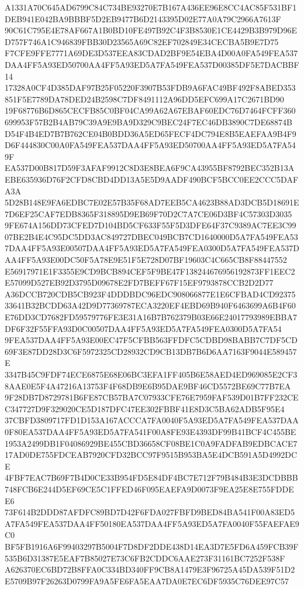 \documentclass[UTF8,fontset=fandol,zihao=-4,a4paper]{ctexart}
\begin{document}
{{A1331A70C645AD6799C84C734BE93270E7B167A436EE96E8CC4AC85F531BF1DEB941E042BA9BBBF5D2EB9477B6D2143395D02E77A0A79C2966A7613F
90C61C795E4E78AF667A1B0BD10FE497B92C4F3B8530E1CE4429B3B979D96ED757F746A1C946839FBB30D23565A69C82EF702849E34CECBA5B9E7D75
F7CFE9FFE7771A69DE3D537EEA83CDAD2BF9E54EBA4D00A0FA549FEA537DAA4FF5A93ED50700AA4FF5A93ED5A7FA549FEA537D00385DF5E7DACBBF14
17328A0CF4D385DAF97B25F05220F3907B53FDB9A6FAC49BF492F8ABED353851F5E7789DA78DED24B2598C7DF8491112A96DD5EFC699A17C2671BD90
19F68776B6D865CECFB85C0BF04CA99A62A67EBAF60EDC76D7464FCFF360699953F57B2B4AB79C39A9E9BA9D329C9BEC24F7EC46DB3890C7DE68874B
D54F4B4ED7B7B762CE04B0BDD36A5ED65FECF4DC794E8B5EAEFAA9B4F9D6F444830C00A0FA549FEA537DAA4FF5A93ED50700AA4FF5A93ED5A7FA549F
EA537D00B817D59F3AFAF9912C8D3E8BEA6F9CA43955BF8792BEC352B13AEBE635936D76F2CFD8CBD4DD13A5E5D9AADF490BCF5BCC0EE2CCC5DAFA3A
5D28B148E9FA6EDBC7E02E57B35F68AD7EEB5CA4623B88AD3DCB5D18691E7D6EF25CAF7EDB8365F318895D9EB69F70D2C7A7CE06D3BF4C57303D3035
9FE674A156DD73CFED7D104BD5CF633F55F5D3DFE64F37C9389AC7EE3C9907BE2B4E4C95DC5DD3AC849727DBEC049BCB7CD1640000D5A7FA549FEA53
7DAA4FF5A93E00507DAA4FF5A93ED5A7FA549FEA0300D5A7FA549FEA537DAA4FF5A93E00DC50F5A78E9E51F5E728D07BF19603C4C665CB8F88447552
E56917971E1F3355E9CD9BCB894CEF5F9BE47F138244676956192873FF1EEC2E57099D527EB92D3795D09678E2FD7BEFF67F15EF9793878CCB2D2D77
A36DCCB720CDB5CB923F4DDDBDC96EDC908066877E1E6CFBAD4CD9237533641B32BCDD63A42D9D77369787ECA3220EF4EBD69B940F6463699A6B4F60
E76DD3CD7682FD59579776FE3E31A16B7B762379B03E66E24017793989EBBA7DF6F32F55FFA93D0C00507DAA4FF5A93ED5A7FA549FEA0300D5A7FA54
9FEA537DAA4FF5A93E00EC47F5CFBB563FFDFC5CDBD98BABB7C7DF5CD69F3E87DD28D3C6F5972325CD28932CD9CB13DB7B6D6AA7163F9044E589457E
3347B45C9FDF74ECE6875E68E06BC3EFA1FF405B6E58AED4ED969085E2CF38AAE0E5F4A47216A13753F4F68DB9E6B95DAE9BF46CD5572BE69C77B7EA
9F28DB7D8729781B6FE87CB57BA7C07933CFE76E7959FAF539D01B7FF232CEC347727D9F329020CE5D187DFC47EE302FBBF41E8D3C5BA62ADB5F95E4
37CBFD3809717FD1D153A167ACCCA7FA0040F5A93ED5A7FA549FEA537DAA0F80EA537DAA4FF5A93ED5A7FA541F00A8FE93E4393DF99B41BCF4C455BE
1953A2499DB1F04086929BE455CBD36658CF08BE1C0A9FADFAB9EDBCACE717AD0DE755FDCEAB7920CFD32BCC97F9515B953BA5E4DCB591A5D4992DCE
4FBF7EAC7B69F7B4D0CE33B954FD5E84DF4BC7E712F79B484B3E3DCDBBB748FCB6E244D5EF69CE5C1FFED46F095EAEFA9D0073F9EA25E8E755FDDEE6
73F614B2DDD87AFDFC89BD7D42F6FDA027FBFD9BED84BA541F00A83ED5A7FA549FEA537DAA4FF50180EA537DAA4FF5A93ED5A7FA0040F55FAEFAE9C0
BF5FB1916A6F99403297B5004F7D8DF2DDE438D14EA3D7E5FD6A459FCB39F535B6D31387E5EAF7B85027E73C6FB2CDDC6AAE273F31161BC7252F538F
A626370EC6BD72B8FFA0C334BD340FF9CB8A1479E3F96725A45DA539F51D2E5709B97F26263D0799FA9A5FE6FA5EAA7DA0E7EC6DF5935C76DEE97C57
}}
\end{document}
